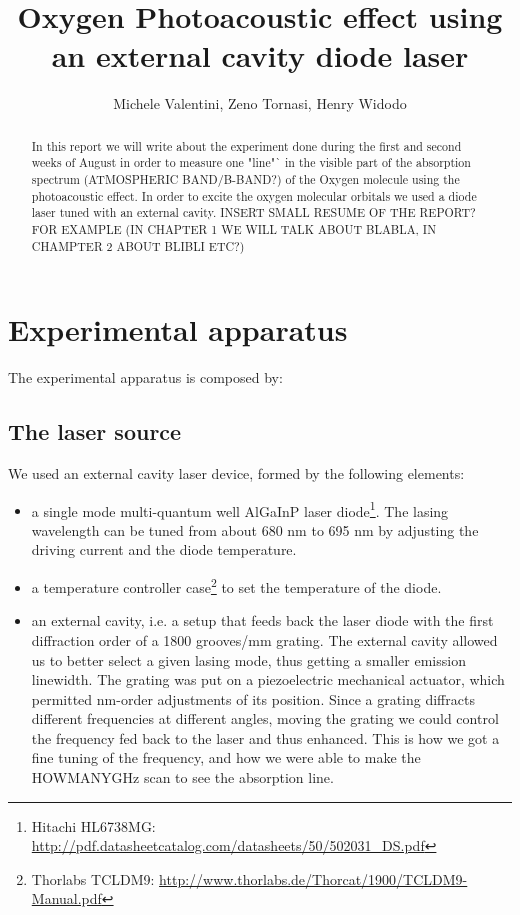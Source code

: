 \documentclass[a4paper,11pt]{article}
\title{Oxygen Photoacoustic effect using an external cavity diode laser}
\author{Michele Valentini, Zeno Tornasi, Henry Widodo}
\begin{document}
\maketitle
\newpage

\begin{abstract}

In this report we will write about the experiment done during the first and second weeks of August in order to measure one "line"` in the visible part of the absorption spectrum (ATMOSPHERIC BAND/B-BAND?) of the Oxygen molecule using the photoacoustic effect. In order to excite the oxygen molecular orbitals we used a diode laser tuned with an external cavity. INSERT SMALL RESUME OF THE REPORT? FOR EXAMPLE (IN CHAPTER 1 WE WILL TALK ABOUT BLABLA, IN CHAMPTER 2 ABOUT BLIBLI ETC?)
\end{abstract}
\newpage
\section{Experimental apparatus}
The experimental apparatus is composed by:
\subsection{The laser source}
We used an external cavity laser device, formed by the following elements:
\begin{itemize}
\item a single mode multi-quantum well AlGaInP laser diode\footnote{Hitachi HL6738MG: \url{http://pdf.datasheetcatalog.com/datasheets/50/502031_DS.pdf}}.
 The lasing wavelength can be tuned from about 680 nm to 695 nm by adjusting the driving current and the diode temperature.
\item a temperature controller case\footnote{Thorlabs TCLDM9: \url{http://www.thorlabs.de/Thorcat/1900/TCLDM9-Manual.pdf}} to set the temperature of the diode. 
\item an external cavity, i.e. a setup that feeds back the laser diode with the first diffraction order of a 1800 grooves/mm grating. The external cavity allowed us to better select a given lasing mode, thus getting a smaller emission linewidth. The grating was put on a piezoelectric mechanical actuator, which permitted nm-order adjustments of its position. Since a grating diffracts different frequencies at different angles, moving the grating we could control the frequency fed back to the laser and thus enhanced. This is how we got a fine tuning of the frequency, and how we were able to make the HOWMANYGHz scan to see the absorption line. 
\end{itemize} 
\end{document}
